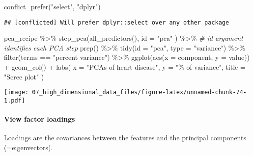 \documentclass[
]{book}
\newenvironment{Shaded}{\begin{snugshade}}{\end{snugshade}}
\newcommand{\AttributeTok}[1]{\textcolor[rgb]{0.77,0.63,0.00}{#1}}
\newcommand{\CommentTok}[1]{\textcolor[rgb]{0.56,0.35,0.01}{\textit{#1}}}
\newcommand{\FunctionTok}[1]{\textcolor[rgb]{0.00,0.00,0.00}{#1}}
\newcommand{\NormalTok}[1]{#1}
\newcommand{\SpecialCharTok}[1]{\textcolor[rgb]{0.00,0.00,0.00}{#1}}
\newcommand{\StringTok}[1]{\textcolor[rgb]{0.31,0.60,0.02}{#1}}
\begin{document}
\begin{Shaded}
\begin{Highlighting}[]
\FunctionTok{conflict\_prefer}\NormalTok{(}\StringTok{"select"}\NormalTok{, }\StringTok{"dplyr"}\NormalTok{)}
\end{Highlighting}
\end{Shaded}

\begin{verbatim}
## [conflicted] Will prefer dplyr::select over any other package
\end{verbatim}

\begin{Shaded}
\begin{Highlighting}[]
\NormalTok{pca\_recipe }\SpecialCharTok{\%\textgreater{}\%}
  \FunctionTok{step\_pca}\NormalTok{(}\FunctionTok{all\_predictors}\NormalTok{(),}
    \AttributeTok{id =} \StringTok{"pca"}
\NormalTok{  ) }\SpecialCharTok{\%\textgreater{}\%} \CommentTok{\# id argument identifies each PCA step}
  \FunctionTok{prep}\NormalTok{() }\SpecialCharTok{\%\textgreater{}\%}
  \FunctionTok{tidy}\NormalTok{(}\AttributeTok{id =} \StringTok{"pca"}\NormalTok{, }\AttributeTok{type =} \StringTok{"variance"}\NormalTok{) }\SpecialCharTok{\%\textgreater{}\%}
  \FunctionTok{filter}\NormalTok{(terms }\SpecialCharTok{==} \StringTok{"percent variance"}\NormalTok{) }\SpecialCharTok{\%\textgreater{}\%}
  \FunctionTok{ggplot}\NormalTok{(}\FunctionTok{aes}\NormalTok{(}\AttributeTok{x =}\NormalTok{ component, }\AttributeTok{y =}\NormalTok{ value)) }\SpecialCharTok{+}
  \FunctionTok{geom\_col}\NormalTok{() }\SpecialCharTok{+}
  \FunctionTok{labs}\NormalTok{(}
    \AttributeTok{x =} \StringTok{"PCAs of heart disease"}\NormalTok{,}
    \AttributeTok{y =} \StringTok{"\% of variance"}\NormalTok{,}
    \AttributeTok{title =} \StringTok{"Scree plot"}
\NormalTok{  )}
\end{Highlighting}
\end{Shaded}

\texttt{[image: 07\_high\_dimensional\_data\_files/figure-latex/unnamed-chunk-74-1.pdf]}

\hypertarget{view-factor-loadings}{%
\paragraph{View factor loadings}\label{view-factor-loadings}}

Loadings are the covariances between the features and the principal components (=eigenvectors).
\end{document}
